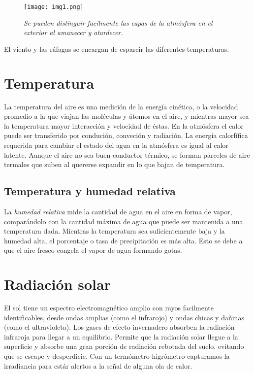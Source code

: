 \documentclass[12pt]{article}
\begin{document}
\begin{figure}[H]
\texttt{[image: img1.png]}
\centering
\caption{\emph{\scriptsize{Se pueden distinguir facilmente las capas de la atm\'osfera en el exterior al amanecer y atardecer.}}}
\end{figure}

El viento y las r\'afagas se encargan de esparcir las diferentes temperaturas.


\section{Temperatura}
\noindent
La temperatura del aire es una medici\'on de la energ\'ia cin\'etica, o la velocidad promedio a la que viajan las mol\'eculas y \'atomos en el aire, y mientras mayor sea la temperatura mayor interacci\'on y velocidad de \'estas. En la atm\'osfera el calor puede ser transferido por conduci\'on, conveci\'on y radiaci\'on. La energ\'ia calorf\'ifica requerida para cambiar el estado del agua en la atm\'osfera es igual al calor latente. Aunque el aire no sea buen conductor t\'ermico, se forman parceles de aire termales que suben al quererse expandir en lo que bajan de temperatura. 
\subsection{Temperatura y humedad relativa}

La \emph{humedad relativa} mide la cantidad de agua en el aire en forma de vapor, comparándolo con la cantidad máxima de agua que puede ser mantenida a una temperatura dada. Mientras la temperatura sea suficientemente baja y la humedad alta, el porcentaje o tasa de precipitaci\'on es m\'as alta. Esto se debe a que el aire fresco congela el vapor de agua formando gotas. 

\section{Radiaci\'on solar}
\noindent

El sol tiene un espectro electromagn\'etico amplio con rayos facilmente identificables, desde ondas amplias (como el infrarojo) y ondas chicas y dañinas (como el ultravioleta). Los gases de efecto invernadero absorben la radiaci\'on infraroja para llegar a un equilibrio. Permite que la radiaci\'on solar llegue a la superficie y absorbe una gran porci\'on de radiaci\'on rebotada del suelo, evitando que se escape y desperdicie. Con un term\'ometro higr\'ometro capturamos la irradiancia para est\'ar alertos a la señal de alguna ola de calor. 
\end{document}
